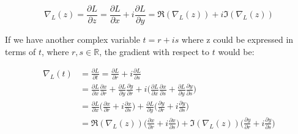 \begin{equation}\label{cvgrad}
\nabla_{L}(z) = \frac{\partial L}{\partial z} = \frac{\partial L}{\partial x} + i\frac{\partial L}{\partial y} = \Re(\nabla_{L}(z))+i\Im(\nabla_{L}(z))
\end{equation}

If we have another complex variable $t=r+is$ where z could be expressed in terms of $t$, where $r,s \in \mathbb{R}$, the gradient with respect to $t$ would be:

\begin{equation}\label{chainchainchain}
\begin{aligned}
\nabla_{L}(t) &= \frac{\partial L}{\partial t} = \frac{\partial L}{\partial r} + i\frac{\partial L}{\partial s}\\
&= \frac{\partial L}{\partial x}\frac{\partial x}{\partial r} + \frac{\partial L}{\partial y}\frac{\partial y}{\partial r}+i\bigg(\frac{\partial L}{\partial x}\frac{\partial x}{\partial s}+\frac{\partial L}{\partial y}\frac{\partial y}{\partial s}\bigg)\\
&= \frac{\partial L}{\partial x}\bigg(\frac{\partial x}{\partial r}+i\frac{\partial x}{\partial s}\bigg)+\frac{\partial L}{\partial y}\bigg(\frac{\partial y}{\partial r}+i\frac{\partial y}{\partial s}\bigg)\\
&= \Re(\nabla_{L}(z))\bigg(\frac{\partial x}{\partial r}+i\frac{\partial x}{\partial s}\bigg)+\Im(\nabla_{L}(z))\bigg(\frac{\partial y}{\partial r}+i\frac{\partial y}{\partial s}\bigg)
\end{aligned}
\end{equation}







